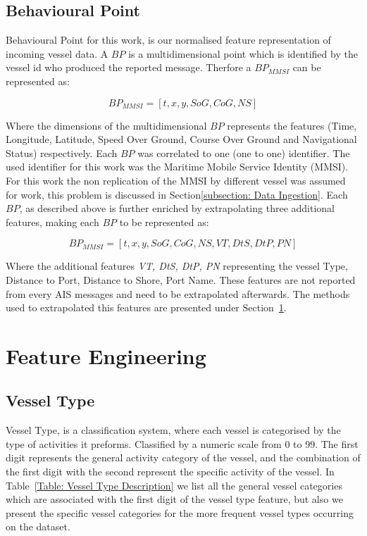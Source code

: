 \subsection{Behavioural Point}
\label{subsection: Behavioural Point}
Behavioural Point for this work, is our normalised feature representation of incoming vessel data. A $BP$ is a multidimensional point which is identified by the vessel id who produced the reported message. Therfore a $BP_{MMSI}$ can be represented as:

\[BP_{MMSI} = [t, x, y, SoG, CoG, NS]\]

Where the dimensions of the multidimensional $BP$ represents the features (Time, Longitude, Latitude, Speed Over Ground, Course Over Ground and Navigational Status) respectively.
Each $BP$ was correlated to one (one to one) identifier. The used identifier for this work was the Maritime Mobile Service Identity (MMSI). For this work the non replication of the MMSI by different vessel was assumed for work, this problem is discussed in Section\ref{subsection: Data Ingestion}.
Each $BP$, as described above is further enriched by extrapolating three additional features, making each $BP$ to be represented as:

\[BP_{MMSI} = [t, x, y, SoG, CoG, NS, VT, DtS, DtP, PN]\]

Where the additional features \emph{VT, DtS, DtP, PN} representing the vessel Type, Distance to Port, Distance to Shore, Port Name. These features are not reported from every AIS messages and need to be extrapolated afterwards. The methods used to extrapolated this features are presented under Section~\ref{section: 4 Feature Engineering}. 

\section{Feature Engineering}
\label{section: 4 Feature Engineering}

\subsection{Vessel Type}
\label{subsection: Vessel Type}
Vessel Type, is a classification system, where each vessel is categorised by the type of activities it preforms. Classified by a numeric scale from 0 to 99. The first digit represents the general activity category of the vessel, and the combination of the first digit with the second represent the specific activity of the vessel. In Table~\ref{Table: Vessel Type Description} we list all the general vessel categories which are associated with the first digit of the vessel type feature, but also we present the specific vessel categories for the more frequent vessel types occurring on the dataset.


